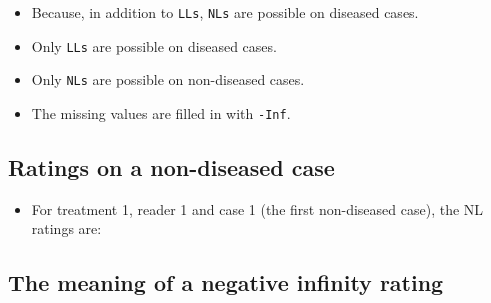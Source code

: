\documentclass[]{book}
\newenvironment{Shaded}{\begin{snugshade}}{\end{snugshade}}
\newcommand{\CommentTok}[1]{\textcolor[rgb]{0.56,0.35,0.01}{\textit{#1}}}
\newcommand{\DecValTok}[1]{\textcolor[rgb]{0.00,0.00,0.81}{#1}}
\newcommand{\NormalTok}[1]{#1}
\newcommand{\OperatorTok}[1]{\textcolor[rgb]{0.81,0.36,0.00}{\textbf{#1}}}
\providecommand{\tightlist}{%
  \setlength{\itemsep}{0pt}\setlength{\parskip}{0pt}}
\begin{document}
\begin{itemize}
\tightlist
\item
  Because, in addition to \texttt{LLs}, \texttt{NLs} are possible on diseased cases.
\item
  Only \texttt{LLs} are possible on diseased cases.
\item
  Only \texttt{NLs} are possible on non-diseased cases.
\item
  The missing values are filled in with \texttt{-Inf}.
\end{itemize}

\hypertarget{ratings-on-a-non-diseased-case-1}{%
\subsection{Ratings on a non-diseased case}\label{ratings-on-a-non-diseased-case-1}}

\begin{itemize}
\tightlist
\item
  For treatment 1, reader 1 and case 1 (the first non-diseased case), the NL ratings are:
\end{itemize}

\begin{Shaded}
\end{Shaded}

\hypertarget{the-meaning-of-a-negative-infinity-rating}{%
\subsection{The meaning of a negative infinity rating}\label{the-meaning-of-a-negative-infinity-rating}}
\end{document}
